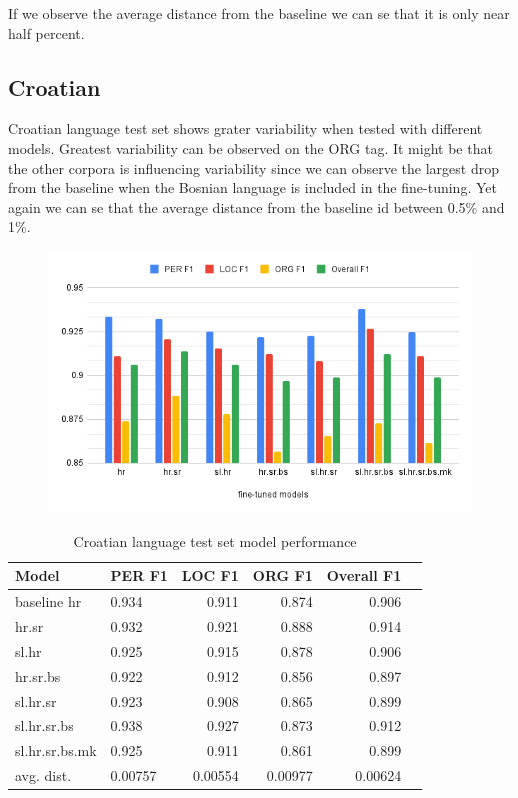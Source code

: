 \documentclass[sigconf]{acmart}
\begin{document}
If we observe the average distance from the baseline we can se that it is only near half percent.

\subsection{Croatian}

Croatian language test set shows grater variability when tested with different models.
Greatest variability can be observed on the ORG tag.
It might be that the other corpora is influencing variability since we can observe the largest drop from the baseline when the Bosnian language is included in the fine-tuning.
Yet again we can se that the average distance from the baseline id between 0.5\% and 1\%.
\begin{figure}[h]
  \label{fig:eval_hr}
  \centering
  \includegraphics[width=\linewidth]{eval_hr}
\end{figure}

\begin{table}[H]
  \caption{Croatian language test set model performance}
  \label{tab:eval_hr}
  \begin{tabular}{llrrrr}
    \toprule
    Model&PER F1&LOC F1&ORG F1&Overall F1\\
    \midrule
    baseline hr&0.934&0.911&0.874&0.906\\
    \midrule
    hr.sr&0.932&0.921&0.888&0.914\\
    sl.hr&0.925&0.915&0.878&0.906\\
    hr.sr.bs&0.922&0.912&0.856&0.897\\
    sl.hr.sr&0.923&0.908&0.865&0.899\\
    sl.hr.sr.bs&0.938&0.927&0.873&0.912\\
    sl.hr.sr.bs.mk&0.925&0.911&0.861&0.899\\
    \midrule
    avg. dist.&0.00757&0.00554&0.00977&0.00624\\
    \bottomrule
  \end{tabular}
\end{table}
\end{document}

